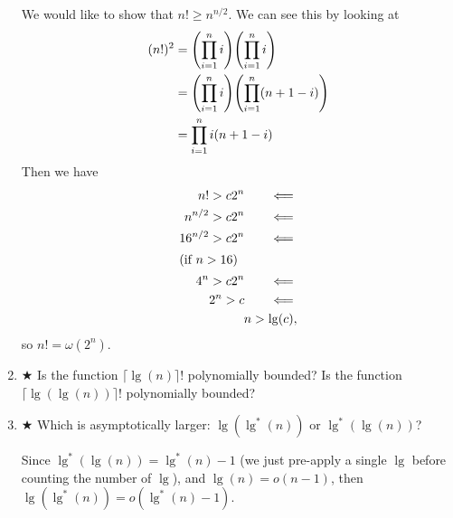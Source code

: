 \documentclass[Chapter03]{subfiles}
\begin{document}
\begin{enumerate}
\begin{answer}
			We would like to show that $n! \geq n^{n/2}$. We can see this by looking at
			\begin{align*}
				(n!)^2 &= \qty(\prod_{i = 1}^n i) \qty(\prod_{i = 1}^n i)\\
					&= \qty(\prod_{i = 1}^n i) \qty(\prod_{i = 1}^n (n + 1 - i))\\
					&= \prod_{i = 1}^n i(n + 1 - i)\\
			\end{align*}
			Then we have
			\begin{align*}
				n! > c2^n \tag*{$\impliedby$}\\
				n^{n/2} > c2^n \tag*{$\impliedby$}\\
				16^{n/2} > c2^n \tag*{$\impliedby$}\\
				\shortintertext{(if $n > 16$)}
				4^n > c2^n \tag*{$\impliedby$}\\
				2^n > c \tag*{$\impliedby$}\\
				n > \lg(c),
			\end{align*}
			so $n! = \omega(2^n)$.
		\end{answer}

		\item $\bigstar$ Is the function $\lceil \lg(n) \rceil !$ polynomially bounded? Is the function $\lceil \lg(\lg(n)) \rceil !$ polynomially bounded?
		\begin{answer}

		\end{answer}

		\item $\bigstar$ Which is asymptotically larger: $\lg(\lg^*(n))$ or $\lg^*(\lg(n))$?
		\begin{answer}
			Since $\lg^*(\lg(n)) = \lg^*(n) - 1$ (we just pre-apply a single $\lg$ before counting the number of $\lg$), and $\lg(n) = o(n - 1)$, then $\lg(\lg^*(n)) = o(\lg^*(n) - 1)$.
		\end{answer}


\end{enumerate}
\end{document}
